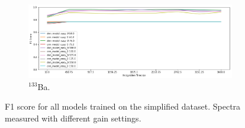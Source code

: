 \begin{figure}[H]
     \begin{subfigure}[b]{0.9\textwidth}
         \centering
         \includegraphics[width=\textwidth]{images/results_easy_distance_comparison}
         \caption{$^{133}$Ba.}
         \label{fig:results_easy_distance_comparison_full}
     \end{subfigure}

        \caption{F1 score for all models trained on the simplified dataset. Spectra measured with different gain settings.}
        \label{fig:results_easy_distance_comparison}
\end{figure}



